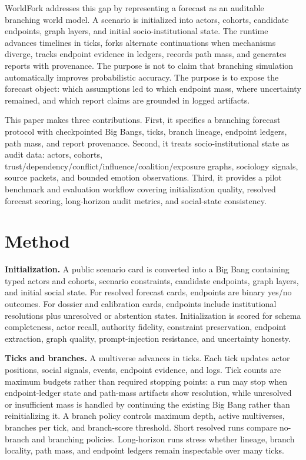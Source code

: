 \documentclass{article}
\begin{document}
WorldFork addresses this gap by representing a forecast as an auditable branching world model. A scenario is initialized into actors, cohorts, candidate endpoints, graph layers, and initial socio-institutional state. The runtime advances timelines in ticks, forks alternate continuations when mechanisms diverge, tracks endpoint evidence in ledgers, records path mass, and generates reports with provenance. The purpose is not to claim that branching simulation automatically improves probabilistic accuracy. The purpose is to expose the forecast object: which assumptions led to which endpoint mass, where uncertainty remained, and which report claims are grounded in logged artifacts.

This paper makes three contributions. First, it specifies a branching forecast protocol with checkpointed Big Bangs, ticks, branch lineage, endpoint ledgers, path mass, and report provenance. Second, it treats socio-institutional state as audit data: actors, cohorts, trust/dependency/conflict/influence/coalition/exposure graphs, sociology signals, source packets, and bounded emotion observations. Third, it provides a pilot benchmark and evaluation workflow covering initialization quality, resolved forecast scoring, long-horizon audit metrics, and social-state consistency.

\section{Method}

\textbf{Initialization.} A public scenario card is converted into a Big Bang containing typed actors and cohorts, scenario constraints, candidate endpoints, graph layers, and initial social state. For resolved forecast cards, endpoints are binary yes/no outcomes. For dossier and calibration cards, endpoints include institutional resolutions plus unresolved or abstention states. Initialization is scored for schema completeness, actor recall, authority fidelity, constraint preservation, endpoint extraction, graph quality, prompt-injection resistance, and uncertainty honesty.

\textbf{Ticks and branches.} A multiverse advances in ticks. Each tick updates actor positions, social signals, events, endpoint evidence, and logs. Tick counts are maximum budgets rather than required stopping points: a run may stop when endpoint-ledger state and path-mass artifacts show resolution, while unresolved or insufficient mass is handled by continuing the existing Big Bang rather than reinitializing it. A branch policy controls maximum depth, active multiverses, branches per tick, and branch-score threshold. Short resolved runs compare no-branch and branching policies. Long-horizon runs stress whether lineage, branch locality, path mass, and endpoint ledgers remain inspectable over many ticks.
\end{document}
